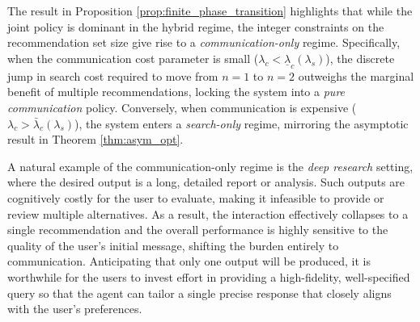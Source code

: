 \documentclass[12pt]{article}
\theoremstyle{definition}
\theoremstyle{remark}
\begin{document}
The result in Proposition \ref{prop:finite_phase_transition} highlights that while the joint  policy is dominant in the hybrid regime, the integer constraints on the recommendation set size give rise to a \textit{communication-only} regime. Specifically, when the communication cost parameter is small ($\lambda_c < \underline \lambda_c(\lambda_s)$), the discrete jump in search cost required to move from $n=1$ to $n=2$ outweighs the marginal benefit of multiple recommendations, locking the system into a \textit{pure communication} policy. Conversely, when communication is expensive ($\lambda_c > \bar{\lambda}_c(\lambda_s)$), the system enters a \textit{search-only} regime, mirroring the asymptotic result in Theorem \ref{thm:asym_opt}.

A natural example of the communication-only regime is the \textit{deep research} setting, where the desired output is a long, detailed report or analysis. Such outputs are cognitively costly for the user to evaluate, making it infeasible to provide or review multiple alternatives. As a result, the interaction effectively collapses to a single recommendation and the overall performance is highly sensitive to the quality of the user’s initial message, shifting the burden entirely to communication. Anticipating that only one output will be produced, it is worthwhile for the users to invest effort in providing a high-fidelity, well-specified query so that the agent can tailor a single precise response that closely aligns with the user's preferences.
\end{document}
